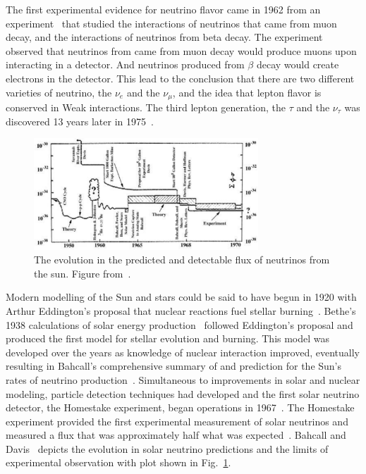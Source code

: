 The first experimental evidence for neutrino flavor came in 1962 from an
experiment~\citep{lederman_muon_flavor} that studied the interactions of
neutrinos that came from muon decay, and the interactions of neutrinos
from beta decay.
The experiment observed that neutrinos from came from muon decay would produce
muons upon interacting in a detector.
And neutrinos produced from $\beta$ decay would create electrons in the
detector.
This lead to the conclusion that there are two different varieties of neutrino,
the $\nu_e$ and the $\nu_{\mu}$, and the idea that lepton flavor is conserved in
Weak interactions.
The third lepton generation, the $\tau$ and the $\nu_{\tau}$ was discovered 13
years later in 1975~\citep{tau_discovery}.

\begin{figure}[htbp]
\centering
\includegraphics[width=0.75\textwidth]{bahcall_evolution}
\caption[Evolution of Solar Neutrino Predictions and Observations]{
The evolution in the predicted and detectable flux of neutrinos from the sun.
Figure from~\citep{bahcall_evolution}.}
\label{fig:solar_evolution_cartoon}
\end{figure}

Modern modelling of the Sun and stars could be said to have begun in 1920 with
Arthur Eddington's proposal that nuclear reactions fuel stellar burning~\citep{eddington}.
Bethe's 1938 calculations of solar energy production~\citep{bethe1, bethe2}
followed Eddington's proposal and produced the first model for stellar evolution and burning.
This model was developed over the years as knowledge of nuclear interaction
improved, eventually resulting in Bahcall's comprehensive summary of and
prediction for the Sun's rates of neutrino
production~\citep{bahcall_solar_neutrinos_theory}.
Simultaneous to improvements in solar and nuclear modeling,
particle detection techniques had developed and
the first solar neutrino detector, the Homestake experiment, began
operations in 1967~\citep{homestake_initial}.
The Homestake experiment provided the first experimental measurement
of solar neutrinos and measured a flux that was approximately half what was expected~\citep{homestake}.
Bahcall and Davis~\citep{bahcall_evolution} depicts the evolution in solar neutrino predictions and
the limits of experimental observation with plot shown in Fig.~\ref{fig:solar_evolution_cartoon}.


